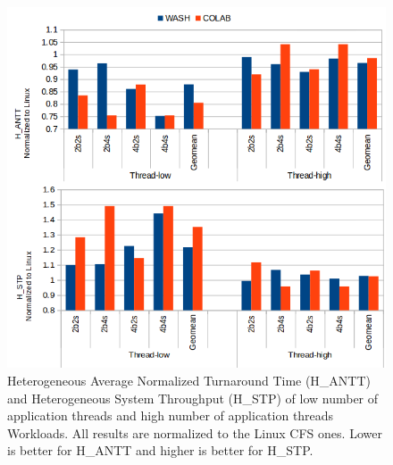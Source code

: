 \begin{figure}
\centering
\includegraphics[scale=0.35]{figures/nthread.png}
\caption{Heterogeneous Average Normalized Turnaround Time (H\_ANTT) and Heterogeneous System Throughput (H\_STP) of low number of application threads and high number of application threads Workloads. All results are normalized to the Linux CFS ones. Lower is better for H\_ANTT and higher is better for H\_STP.}
\label{nthread}
\end{figure} 

